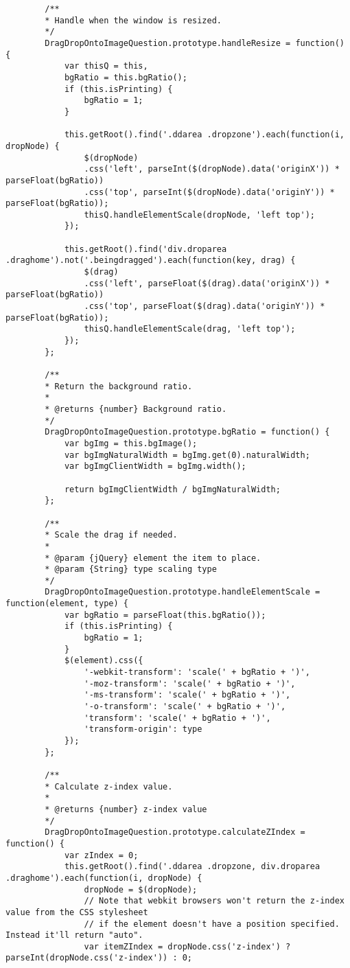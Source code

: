 \begin{lstlisting}
		/**
		* Handle when the window is resized.
		*/
		DragDropOntoImageQuestion.prototype.handleResize = function() {
			var thisQ = this,
			bgRatio = this.bgRatio();
			if (this.isPrinting) {
				bgRatio = 1;
			}
			
			this.getRoot().find('.ddarea .dropzone').each(function(i, dropNode) {
				$(dropNode)
				.css('left', parseInt($(dropNode).data('originX')) * parseFloat(bgRatio))
				.css('top', parseInt($(dropNode).data('originY')) * parseFloat(bgRatio));
				thisQ.handleElementScale(dropNode, 'left top');
			});
			
			this.getRoot().find('div.droparea .draghome').not('.beingdragged').each(function(key, drag) {
				$(drag)
				.css('left', parseFloat($(drag).data('originX')) * parseFloat(bgRatio))
				.css('top', parseFloat($(drag).data('originY')) * parseFloat(bgRatio));
				thisQ.handleElementScale(drag, 'left top');
			});
		};
		
		/**
		* Return the background ratio.
		*
		* @returns {number} Background ratio.
		*/
		DragDropOntoImageQuestion.prototype.bgRatio = function() {
			var bgImg = this.bgImage();
			var bgImgNaturalWidth = bgImg.get(0).naturalWidth;
			var bgImgClientWidth = bgImg.width();
			
			return bgImgClientWidth / bgImgNaturalWidth;
		};
		
		/**
		* Scale the drag if needed.
		*
		* @param {jQuery} element the item to place.
		* @param {String} type scaling type
		*/
		DragDropOntoImageQuestion.prototype.handleElementScale = function(element, type) {
			var bgRatio = parseFloat(this.bgRatio());
			if (this.isPrinting) {
				bgRatio = 1;
			}
			$(element).css({
				'-webkit-transform': 'scale(' + bgRatio + ')',
				'-moz-transform': 'scale(' + bgRatio + ')',
				'-ms-transform': 'scale(' + bgRatio + ')',
				'-o-transform': 'scale(' + bgRatio + ')',
				'transform': 'scale(' + bgRatio + ')',
				'transform-origin': type
			});
		};
		
		/**
		* Calculate z-index value.
		*
		* @returns {number} z-index value
		*/
		DragDropOntoImageQuestion.prototype.calculateZIndex = function() {
			var zIndex = 0;
			this.getRoot().find('.ddarea .dropzone, div.droparea .draghome').each(function(i, dropNode) {
				dropNode = $(dropNode);
				// Note that webkit browsers won't return the z-index value from the CSS stylesheet
				// if the element doesn't have a position specified. Instead it'll return "auto".
				var itemZIndex = dropNode.css('z-index') ? parseInt(dropNode.css('z-index')) : 0;
				

\end{lstlisting}
